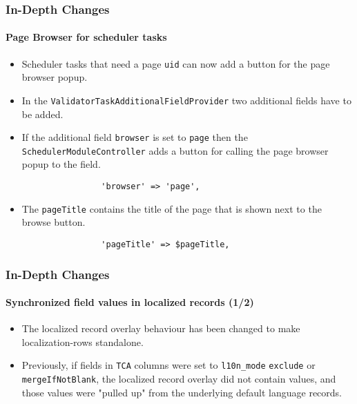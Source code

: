 \begin{frame}[fragile]
	\frametitle{In-Depth Changes}
	\framesubtitle{Page Browser for scheduler tasks}

	\begin{itemize}
		\item Scheduler tasks that need a page \texttt{uid} can now add a button for the page browser popup.

		\item In the \texttt{ValidatorTaskAdditionalFieldProvider} two additional fields have to be added.

		\item If the additional field \texttt{browser} is set to \texttt{page} then the
			\texttt{SchedulerModuleController} adds a button for calling the page browser popup to the field.

			\begin{lstlisting}
				'browser' => 'page',
			\end{lstlisting}

		\item The \texttt{pageTitle} contains the title of the page that is shown next to the browse button.

			\begin{lstlisting}
				'pageTitle' => $pageTitle,
			\end{lstlisting}

	\end{itemize}

\end{frame}


\begin{frame}[fragile]
	\frametitle{In-Depth Changes}
	\framesubtitle{Synchronized field values in localized records (1/2)}

	\lstset{basicstyle=\tiny\ttfamily}

	\begin{itemize}
		\item The localized record overlay behaviour has been changed to make localization-rows standalone.

		\item Previously, if fields in \texttt{TCA} columns were set to \texttt{l10n\_mode} \texttt{exclude} or
			\texttt{mergeIfNotBlank}, the localized record overlay did not contain values, and those values were
			"pulled up" from the underlying default language records.

	\end{itemize}

\end{frame}

